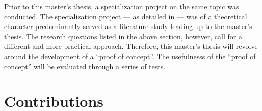 \begin{comment}
What methodology will you apply to address the goals: theoretic/analytic, model/abstraction or design/experiment?
This section will describe the research methodology applied and the reason for this choice of research methodology.
You should return to the actual choices made in the work and the alternatives in the Discussion chapter.
\end{comment}

Prior to this master's thesis, a specialization project on the same topic was conducted. The specialization project --- as detailed in \citep{holmLLMsDeathGIS2023} --- was of a theoretical character predominantly served as a literature study leading up to the master's thesis. The research questions listed in the above section, however, call for a different and more practical approach. Therefore, this master's thesis will revolve around the development of a \enquote{proof of concept}. The usefulnesss of the \enquote{proof of concept} will be evaluated through a series of tests.


\section{Contributions}
\label{sec:intro-contributions}

\begin{comment}
This section just provides a brief summary of the main contributions of the work.
The main description of the contributions will come in Section~\ref{sec:contributions}, after the results are presented.
(Hence Section~\ref{sec:introContributions} can also be left out, leaving the discussion completely to Section~\ref{sec:contributions}.)

The format of this section will generally be as follows:

\begin{enumerate}
    \item \textit{Lorem ipsum dolor sit amet, consectetur adipiscing elit.}
    \item \textit{Lorem ipsum dolor sit amet, consectetur adipiscing elit.}
    \item \textit{Lorem ipsum dolor sit amet, consectetur adipiscing elit.}
\end{enumerate}

\noindent
where the items on the list briefly describe the key contributions.

The order of the contributions here is important. List your main contribution first!
Creating this list will help you not only with writing the Conclusion (where all items listed here definitely should be included, and in more detail),
but also with items that need to be mentioned in the Abstract, as well as with points that you will want to bring to attention in the Discussion.
Hence most of the content on this list will be addressed 4--5 times in your text: here, in the Abstract, Discussion, Conclusion, and (most likely)
in the Results chapter.
\end{comment}

